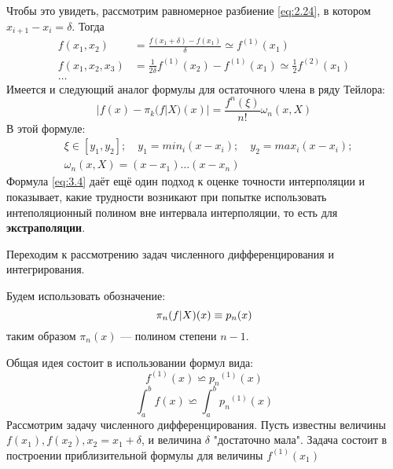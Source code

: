 Чтобы это увидеть, рассмотрим равномерное разбиение \ref{eq:2.24}, в котором $x_{i+1}-x_i=\delta$. Тогда 
\begin{dmath}
\begin{aligned}
	f(x_1, x_2) &= \frac{f(x_1+\delta) - f(x_1)}{\delta} \simeq f^{(1)}(x_1) \\
	f(x_1, x_2, x_3) &= \frac{1}{2\delta}f^{(1)}(x_2)-f^{(1)}(x_1) \simeq  \frac{1}{2}f^{(2)}(x_1) \\
	\dots
\end{aligned}
\end{dmath}
Имеется и следующий аналог формулы для остаточного члена в ряду Тейлора:
\begin{equation} \label{eq:3.4}
	|f(x) - \pi_k(f|X)(x)| = \frac{f^{n}(\xi)}{n!} \omega_n (x,X)
\end{equation}
В этой формуле:
\begin{equation} \label{eq:3.5}
\begin{aligned}
	&\xi \in [y_1, y_2]; \quad y_1=min_{i}(x-x_i); \quad y_2=max_{i}(x-x_i) ;\\ 
	&\omega_n(x, X) = (x-x_1)\dots(x-x_n)
\end{aligned}
\end{equation}
Формула \ref{eq:3.4} даёт ещё один подход к оценке точности интерполяции и показывает, какие трудности возникают при попытке использовать интеполяционный полином вне интервала интерполяции, то есть для \textbf{экстраполяции}.

\bigskip
Переходим к рассмотрению задач численного дифференцирования и интегрирования. 

Будем использовать обозначение:
\begin{equation}
	\pi_n(f|X)(x) \equiv p_n(x)\\
\end{equation}
таким образом $\pi_n(x)$ --- полином степени $n-1$.

Общая идея состоит в использовании формул вида: 
\begin{equation} \label{eq:2.8}
	f^{(1)}(x) \backsimeq {p_n}^{(1)}(x)
\end{equation}
\begin{equation}
	\int_{a}^{b}f(x) \backsimeq \int_{a}^{b}{p_n}^{(1)}(x)
\end{equation}
Рассмотрим задачу численного дифференцирования. Пусть известны величины $f(x_1), f(x_2), x_2 = x_1 + \delta$, и величина $\delta$ "достаточно мала". Задача состоит в построении приблизительной формулы для величины $f^{(1)}(x_1)$

